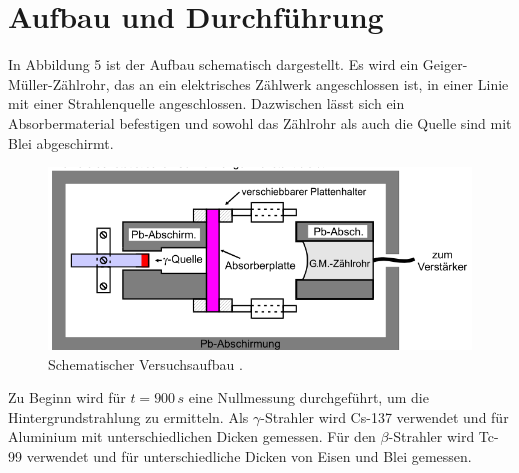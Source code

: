 \section{Aufbau und Durchführung}
\label{sec:Durchfuehrung}
In Abbildung 5 ist der Aufbau schematisch dargestellt. Es wird ein Geiger-Müller-Zählrohr, das an ein
elektrisches Zählwerk angeschlossen ist, in einer Linie mit einer Strahlenquelle angeschlossen. Dazwischen
lässt sich ein Absorbermaterial befestigen und sowohl das Zählrohr als auch die Quelle sind mit Blei abgeschirmt.
\begin{figure}
    \centering
    \label{fig:Aufbau}
    \includegraphics{Bilder/Aufbau.png}
    \caption{Schematischer Versuchsaufbau \cite{sample}.}
\end{figure}
Zu Beginn wird für $t=900\,\unit{s}$ eine Nullmessung durchgeführt, um die Hintergrundstrahlung zu ermitteln.
Als $\gamma$-Strahler wird Cs-137 verwendet und für Aluminium mit unterschiedlichen Dicken gemessen. Für den
$\beta$-Strahler wird Tc-99 verwendet und für unterschiedliche Dicken von Eisen und Blei gemessen.